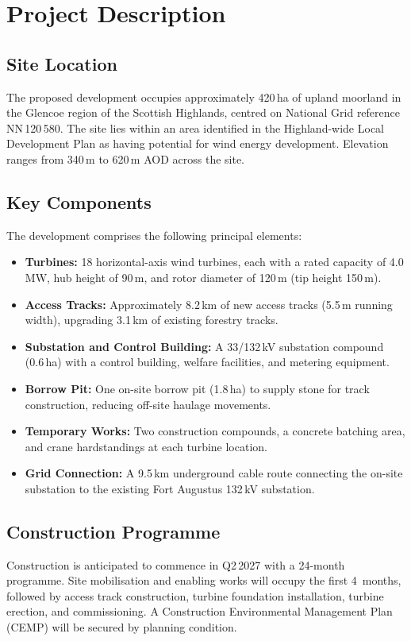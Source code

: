 \section{Project Description}

\subsection{Site Location}
The proposed development occupies approximately 420\,ha of upland moorland in the Glencoe region of the Scottish Highlands, centred on National Grid reference NN\,120\,580. The site lies within an area identified in the Highland-wide Local Development Plan as having potential for wind energy development. Elevation ranges from 340\,m to 620\,m AOD across the site.

\subsection{Key Components}
The development comprises the following principal elements:

\begin{itemize}
  \item \textbf{Turbines:} 18 horizontal-axis wind turbines, each with a rated capacity of 4.0\,MW, hub height of 90\,m, and rotor diameter of 120\,m (tip height 150\,m).
  \item \textbf{Access Tracks:} Approximately 8.2\,km of new access tracks (5.5\,m running width), upgrading 3.1\,km of existing forestry tracks.
  \item \textbf{Substation and Control Building:} A 33/132\,kV substation compound (0.6\,ha) with a control building, welfare facilities, and metering equipment.
  \item \textbf{Borrow Pit:} One on-site borrow pit (1.8\,ha) to supply stone for track construction, reducing off-site haulage movements.
  \item \textbf{Temporary Works:} Two construction compounds, a concrete batching area, and crane hardstandings at each turbine location.
  \item \textbf{Grid Connection:} A 9.5\,km underground cable route connecting the on-site substation to the existing Fort Augustus 132\,kV substation.
\end{itemize}

\subsection{Construction Programme}
Construction is anticipated to commence in Q2\,2027 with a 24-month programme. Site mobilisation and enabling works will occupy the first 4~months, followed by access track construction, turbine foundation installation, turbine erection, and commissioning. A Construction Environmental Management Plan (CEMP) will be secured by planning condition.

